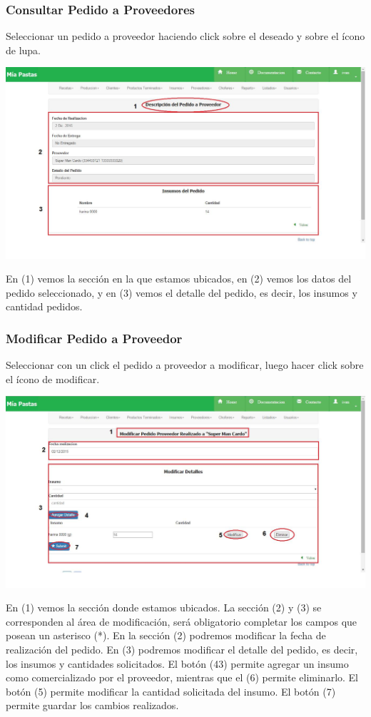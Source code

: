 \documentclass[letterpaper,10pt,english]{sphinxmanual}
\begin{document}
\subsubsection{Consultar Pedido a Proveedores}
\label{pedidosProveedor:consultar-pedido-a-proveedores}
Seleccionar un pedido a proveedor haciendo click sobre el deseado y sobre el ícono de lupa.

\includegraphics{pedidos_detalle.jpg}

En (1) vemos la sección en la que estamos ubicados, en (2) vemos los datos del pedido seleccionado, y en (3) vemos el detalle del pedido, es decir, los insumos y cantidad pedidos.


\subsubsection{Modificar Pedido a Proveedor}
\label{pedidosProveedor:modificar-pedido-a-proveedor}
Seleccionar con un click el pedido a proveedor a modificar, luego hacer click sobre el ícono de modificar.

\includegraphics{pedidos_modificar.jpg}

En (1) vemos la sección donde estamos ubicados. La sección (2) y (3) se corresponden al área de modificación, será obligatorio completar los campos que posean un asterisco (*). En la sección (2) podremos modificar la fecha de realización del pedido. En (3) podremos modificar el detalle del pedido, es decir, los insumos y cantidades solicitados. El botón (43) permite agregar un insumo como comercializado por el proveedor, mientras que el (6) permite eliminarlo. El botón (5) permite modificar la cantidad solicitada del insumo. El botón (7) permite guardar los cambios realizados.
\end{document}
